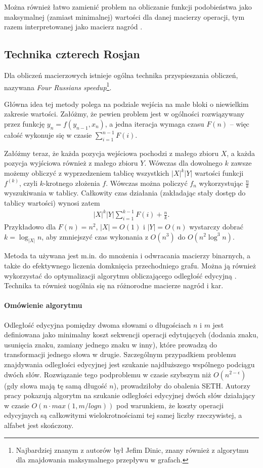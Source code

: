 Można również łatwo zamienić problem na obliczanie funkcji podobieństwa jako maksymalnej (zamiast minimalnej) wartości dla danej macierzy operacji, tym razem interpretowanej jako macierz nagród \citep{sellers1974theory}.

\subsection{Technika czterech Rosjan}

Dla obliczeń macierzowych istnieje ogólna technika przyspieszania obliczeń, nazywana \emph{Four Russians speedup}\footnote{Najbardziej znanym z autorów był Jefim Dinic, znany również z algorytmu dla znajdowania maksymalnego przepływu w grafach.}.

Główna idea tej metody polega na podziale wejścia na małe bloki o niewielkim zakresie wartości.
Załóżmy, że pewien problem jest w ogólności rozwiązywany przez funkcję $y_n = f(y_{n - 1}, x_n)$, a jedna iteracja wymaga czasu $F(n)$ -- więc całość wykonuje się w czasie $\sum_{i = 1}^{n - 1} F(i)$.

Załóżmy teraz, że każda pozycja wejściowa pochodzi z małego zbioru $X$, a każda pozycja wyjściowa również z małego zbioru $Y$.
Wówczas dla dowolnego $k$ zawsze możemy obliczyć z wyprzedzeniem tablicę wszystkich $|X|^k |Y|$ wartości funkcji $f^{(k)}$, czyli $k$-krotnego złożenia $f$.
Wówczas można policzyć $f_n$ wykorzystując $\frac{n}{k}$ wyszukiwania w tablicy. Całkowity czas działania (zakładając stały dostęp do tablicy wartości) wynosi zatem
\begin{align*}
  |X|^k |Y| \sum_{i = 1}^{k - 1} F(i) + \frac{n}{k}.
\end{align*}
Przykładowo dla $F(n) = n^2$, $|X| = O(1)$ i $|Y| = O(n)$ wystarczy dobrać $k = \log_{|X|}{n}$, aby zmniejszyć czas wykonania z $O(n^3)$ do $O(n^2 \log^3{n})$.

Metoda ta używana jest m.in. do mnożenia i odwracania macierzy binarnych, a także do efektywnego liczenia domknięcia przechodniego grafu. Można ją również wykorzystać do optymalizacji algorytmu obliczającego odległość edycyjną \citep{masek1980faster}. Technika ta również uogólnia się na różnorodne macierze nagród i kar.

\paragraph{Omówienie algorytmu}

Odległość edycyjna pomiędzy dwoma słowami o długościach $n$ i $m$ jest definiowana jako minimalny koszt sekwencji operacji edytujących (dodania znaku, usunięcia znaku, zamiany jednego znaku w inny), które prowadzą do transformacji jednego słowa w drugie. Szczególnym przypadkiem problemu znajdywania odległości edycyjnej jest szukanie najdłuższego wspólnego podciągu dwóch słów. Rozwiązanie tego podproblemu w czasie szybszym niż $O(n^{2-\epsilon})$ (gdy słowa mają tę samą długość $n$), prowadziłoby do obalenia SETH. Autorzy pracy pokazują algorytm na szukanie odległości edycyjnej dwóch słów działający w czasie $O(n \cdot max(1,m/log n))$ pod warunkiem, że koszty operacji edycyjnych są całkowitymi wielokrotnościami tej samej liczby rzeczywistej, a alfabet jest skończony.

